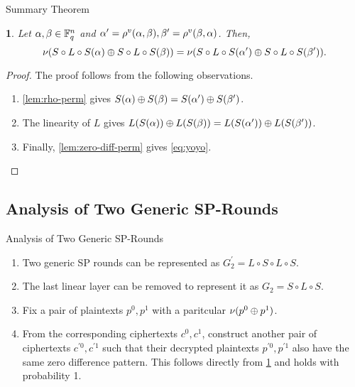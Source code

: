 \documentclass[notheorems]{beamer}
\newtheorem{theorem}{\translate{Theorem}}[section]
\newtheorem{theorem}{\translate{Theorem}}
\theoremstyle{definition}
\theoremstyle{example}
\begin{document}
    \begin{frame}{Summary Theorem}
        \begin{theorem}
            \label{thm:yoyo}
            Let \(\alpha, \beta \in \mathbb F_q^n\) and \(\alpha^\prime =
            \rho^v(\alpha, \beta), \beta^\prime = \rho^v(\beta,
            \alpha)\). Then,
            \begin{equation}
                \nu(S \circ L \circ S(\alpha) \oplus S \circ L \circ S(\beta)) = \nu(S \circ L \circ S(\alpha^\prime) \oplus S \circ L \circ S(\beta^\prime)).
                \label{eq:yoyo}
            \end{equation}
        \end{theorem}
        \pause
        \begin{proof}
            The proof follows from the following observations.
            \begin{enumerate}
                \item \cref{lem:rho-perm} gives \(S(\alpha) \oplus
                S(\beta) = S(\alpha^\prime) \oplus
                S(\beta^\prime)\).
                \item The linearity of \(L\) gives \(L(S(\alpha))
                \oplus L(S(\beta)) = L(S(\alpha^\prime))
                \oplus L(S(\beta^\prime))\).
                \item Finally, \cref{lem:zero-diff-perm} gives \eqref{eq:yoyo}.
            \end{enumerate} 
        \end{proof}
    \end{frame}

    \subsection{Analysis of Two Generic SP-Rounds}
    \label{subsec:yoyo-2-rounds}

    \begin{frame}[<+->]{Analysis of Two Generic SP-Rounds}
        \begin{enumerate}
            \item Two generic SP rounds can be represented as \(G_2^\prime = L
            \circ S \circ L \circ S\).
            \item The last linear layer can be removed to represent it as \(G_2
            = S \circ L \circ S\). 
            \item Fix a pair of plaintexts \(p^0, p^1\) with a paritcular
            \(\nu(p^0 \oplus p^1)\). 
            \item From the corresponding ciphertexts \(c^0, c^1\), construct
            another pair of ciphertexts \(c^{\prime 0}, c^{\prime 1}\) such that
            their decrypted plaintexts \(p^{\prime 0}, p^{\prime 1}\) also have
            the same zero difference pattern. This follows directly from
            \cref{thm:yoyo} and holds with probability 1.
        \end{enumerate}
    \end{frame}
\end{document}
